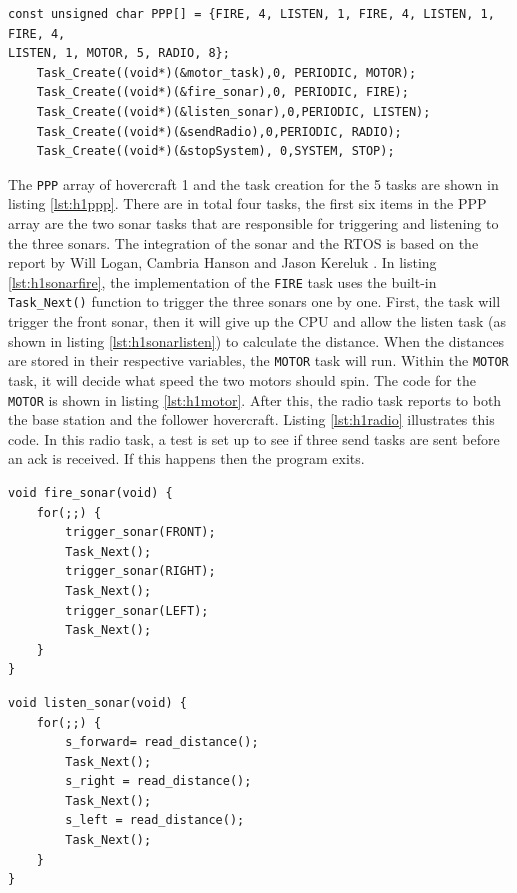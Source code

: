 \begin{lstlisting}[float=th,label=lst:h1ppp,
                   caption={\texttt{PPP} array and task creation for hovercraft 1}]
const unsigned char PPP[] = {FIRE, 4, LISTEN, 1, FIRE, 4, LISTEN, 1, FIRE, 4,
LISTEN, 1, MOTOR, 5, RADIO, 8};
    Task_Create((void*)(&motor_task),0, PERIODIC, MOTOR);
    Task_Create((void*)(&fire_sonar),0, PERIODIC, FIRE);
    Task_Create((void*)(&listen_sonar),0,PERIODIC, LISTEN);
    Task_Create((void*)(&sendRadio),0,PERIODIC, RADIO);
	Task_Create((void*)(&stopSystem), 0,SYSTEM, STOP); 
\end{lstlisting}
The \texttt{PPP} array of hovercraft 1 and the task creation for the 5 tasks are shown in listing \ref{lst:h1ppp}.
There are in total four tasks, the first six items in the PPP array are the
two sonar tasks that are responsible for triggering and listening
to the three sonars. The integration of the sonar and the RTOS is based on the report by Will
Logan, Cambria Hanson and Jason Kereluk \cite{autoB}. In listing \ref{lst:h1sonarfire}, the implementation of the
\texttt{FIRE} task uses the built-in \texttt{Task\_Next()} function to trigger
the three sonars one by one. First, the task will trigger the front sonar, then
it will give up the CPU and allow the listen task (as shown in listing
\ref{lst:h1sonarlisten}) to calculate the distance. When the distances are
stored in their respective variables, the \texttt{MOTOR} task will run. Within
the \texttt{MOTOR} task, it will decide what speed the two motors should spin.
The code for the \texttt{MOTOR} is shown in listing \ref{lst:h1motor}. After
this, the radio task reports to both the base station and the follower
hovercraft. Listing \ref{lst:h1radio} illustrates this code. In this radio task, a test is set up to see if
three send tasks are sent before an ack is received. If this happens then the
program exits.

\begin{lstlisting}[float=thp,label=lst:h1sonarfire,
                   caption={\texttt{FIRE} Task}]
void fire_sonar(void) {
	for(;;) {
		trigger_sonar(FRONT);
		Task_Next();
		trigger_sonar(RIGHT);
		Task_Next();
		trigger_sonar(LEFT);
		Task_Next();
	}
}
\end{lstlisting}

\begin{lstlisting}[label=lst:h1sonarlisten,float=tbh,
                   caption={\texttt{LISTEN} Task}]
void listen_sonar(void) {
	for(;;)	{
	    s_forward= read_distance();
	    Task_Next();
	    s_right = read_distance();
	    Task_Next();
	    s_left = read_distance();
	    Task_Next();
	}
}
\end{lstlisting}


